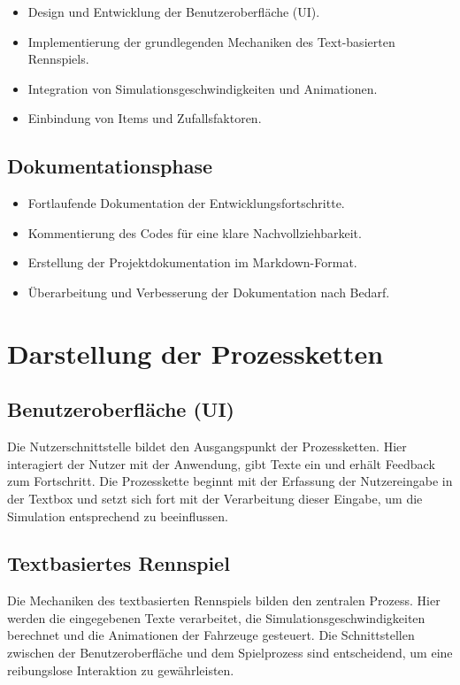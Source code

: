 \documentclass[hidelinks,12pt]{article}
\begin{document}
\begin{itemize}
    \item Design und Entwicklung der Benutzeroberfläche (UI).
    \item Implementierung der grundlegenden Mechaniken des Text-basierten Rennspiels.
    \item Integration von Simulationsgeschwindigkeiten und Animationen.
    \item Einbindung von Items und Zufallsfaktoren.
\end{itemize}

\subsection{Dokumentationsphase}

\begin{itemize}
    \item Fortlaufende Dokumentation der Entwicklungsfortschritte.
    \item Kommentierung des Codes für eine klare Nachvollziehbarkeit.
    \item Erstellung der Projektdokumentation im Markdown-Format.
    \item Überarbeitung und Verbesserung der Dokumentation nach Bedarf.
\end{itemize}

\section{Darstellung der Prozessketten}

\subsection{Benutzeroberfläche (UI)}
Die Nutzerschnittstelle bildet den Ausgangspunkt der Prozessketten. Hier interagiert der Nutzer mit der Anwendung, gibt Texte ein und erhält Feedback zum Fortschritt. Die Prozesskette beginnt mit der Erfassung der Nutzereingabe in der Textbox und setzt sich fort mit der Verarbeitung dieser Eingabe, um die Simulation entsprechend zu beeinflussen.

\subsection{Textbasiertes Rennspiel}
Die Mechaniken des textbasierten Rennspiels bilden den zentralen Prozess. Hier werden die eingegebenen Texte verarbeitet, die Simulationsgeschwindigkeiten berechnet und die Animationen der Fahrzeuge gesteuert. Die Schnittstellen zwischen der Benutzeroberfläche und dem Spielprozess sind entscheidend, um eine reibungslose Interaktion zu gewährleisten.
\end{document}
